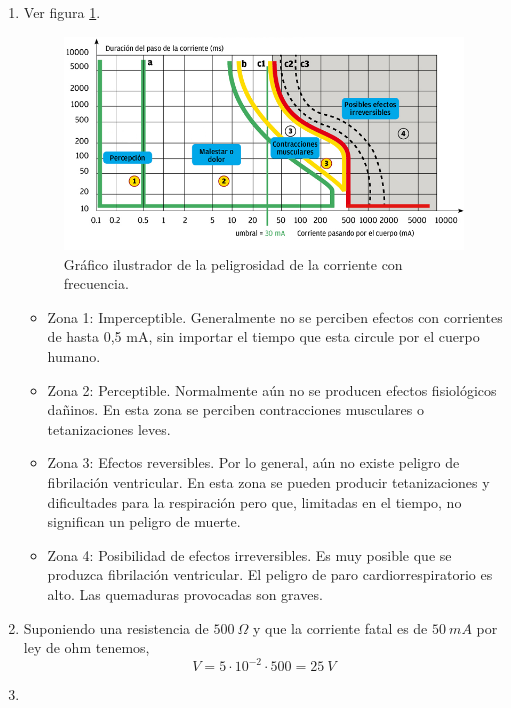 \begin{enumerate}[resume]
     \item %
     Ver figura \ref{figura pregunta 12}.
     \begin{figure}[H]
         \centering
         \includegraphics[width=\textwidth]{Imagenes/Seguridad/S3/p12.png}
         \caption{Gráfico ilustrador de la peligrosidad de la corriente con frecuencia.}
         \label{figura pregunta 12}
     \end{figure}
     \begin{itemize}
     
         \item Zona 1: Imperceptible. Generalmente no se perciben efectos con corrientes de hasta 0,5 mA, sin importar el tiempo que esta circule por el cuerpo humano.
         \item Zona 2: Perceptible. Normalmente aún no se producen efectos fisiológicos dañinos. En esta zona se perciben contracciones musculares o tetanizaciones leves.
         \item Zona 3: Efectos reversibles. Por lo general, aún no existe peligro de fibrilación ventricular. En esta zona se pueden producir tetanizaciones y dificultades para la respiración pero que, limitadas en el tiempo, no significan un peligro de muerte.
         \item Zona 4: Posibilidad de efectos irreversibles. Es muy posible que se produzca fibrilación ventricular. El peligro de paro cardiorrespiratorio es alto. Las quemaduras provocadas son graves.
         
     \end{itemize}
     \item %
     Suponiendo una resistencia de $500\ \Omega$ y que la corriente fatal es de $50 \ mA$ por ley de ohm tenemos,
     \begin{equation}
         V = 5 \cdot 10^{-2} \cdot 500 = 25 \ V
     \end{equation}
     \item %
        

\end{enumerate}
